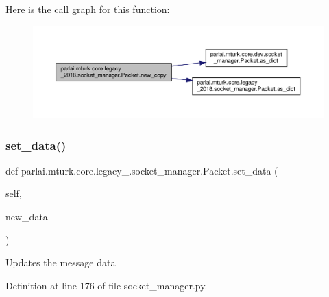 Here is the call graph for this function\+:
\nopagebreak
\begin{figure}[H]
\begin{center}
\leavevmode
\includegraphics[width=350pt]{classparlai_1_1mturk_1_1core_1_1legacy__2018_1_1socket__manager_1_1Packet_aabcd943398680a33c0a313da2ec1a767_cgraph}
\end{center}
\end{figure}
\mbox{\label{classparlai_1_1mturk_1_1core_1_1legacy__2018_1_1socket__manager_1_1Packet_a3e06e555eadd65177cea1346992cf9b8}} 
\subsubsection{\texorpdfstring{set\+\_\+data()}{set\_data()}}
{\footnotesize\ttfamily def parlai.\+mturk.\+core.\+legacy\+\_.\+socket\+\_\+manager.\+Packet.\+set\+\_\+data (\begin{DoxyParamCaption}\item[{}]{self,  }\item[{}]{new\+\_\+data }\end{DoxyParamCaption})}

\begin{DoxyVerb}Updates the message data\end{DoxyVerb}
 

Definition at line 176 of file socket\+\_\+manager.\+py.



